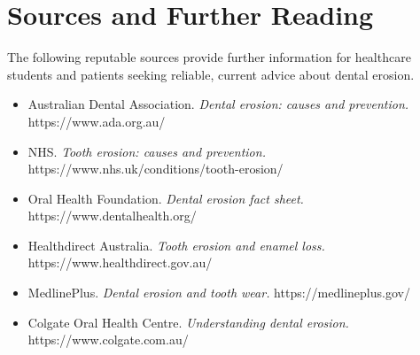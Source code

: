 \section*{Sources and Further Reading}
The following reputable sources provide further information for healthcare students and patients seeking reliable, current advice about dental erosion.

\begin{itemize}
    \item Australian Dental Association. \textit{Dental erosion: causes and prevention.} https://www.ada.org.au/
    \item NHS. \textit{Tooth erosion: causes and prevention.} https://www.nhs.uk/conditions/tooth-erosion/
    \item Oral Health Foundation. \textit{Dental erosion fact sheet.} https://www.dentalhealth.org/
    \item Healthdirect Australia. \textit{Tooth erosion and enamel loss.} https://www.healthdirect.gov.au/
    \item MedlinePlus. \textit{Dental erosion and tooth wear.} https://medlineplus.gov/
    \item Colgate Oral Health Centre. \textit{Understanding dental erosion.} https://www.colgate.com.au/
\end{itemize}
